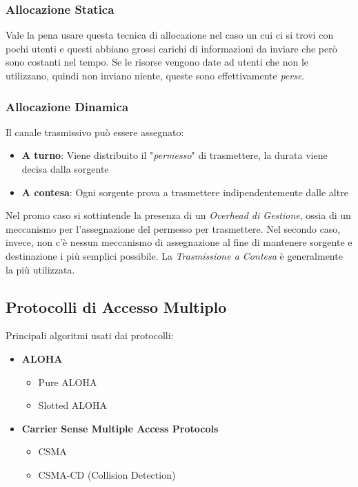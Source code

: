 \documentclass{article}
\begin{document}
            \subsubsection{Allocazione Statica}
                Vale la pena usare questa tecnica di allocazione nel caso un cui ci si trovi con pochi utenti e questi abbiano grossi carichi di informazioni da inviare che però sono costanti nel tempo. Se le risorse vengono date ad utenti che non le utilizzano, quindi non inviano niente, queste sono effettivamente \textit{perse}.
            
            \subsubsection{Allocazione Dinamica}
                Il canale trasmissivo può essere assegnato:
                \begin{itemize}
                    \item \textbf{A turno}: Viene distribuito il "\textit{permesso}" di trasmettere, la durata viene decisa dalla sorgente
                    \item \textbf{A contesa}: Ogni sorgente prova a trasmettere indipendentemente dalle altre
                \end{itemize}
                Nel promo caso si sottintende la presenza di un \textit{Overhead di Gestione}, ossia di un meccanismo per l'assegnazione del permesso per trasmettere. Nel secondo caso, invece, non c'è nessun meccanismo di assegnazione al fine di mantenere sorgente e destinazione i più semplici possibile. La \textit{Trasmissione a Contesa} è generalmente la più utilizzata.

        \subsection{Protocolli di Accesso Multiplo}
            Principali algoritmi usati dai protocolli:
                \begin{itemize}
                    \item \textbf{ALOHA}
                          \begin{itemize}
                              \item Pure ALOHA
                              \item Slotted ALOHA
                          \end{itemize}
                    \item \textbf{Carrier Sense Multiple Access Protocols}
                          \begin{itemize}
                              \item CSMA
                              \item CSMA-CD (Collision Detection)
                          \end{itemize}
                \end{itemize}
\end{document}
